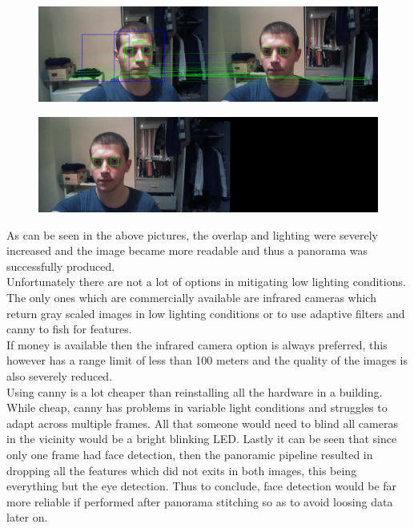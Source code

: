 \documentclass{article}
\begin{document}
\begin{figure}[H]
	\centering
	\includegraphics[width=15cm]{pkv.png}
	
	
\end{figure}
\begin{figure}[H]
	\centering
	\includegraphics[width=15cm]{pkr.png}
	
	
\end{figure}
As can be seen in the above pictures, the overlap and lighting were severely increased and the image became more readable and thus a panorama was successfully produced.\\
Unfortunately there are not a lot of options in mitigating low lighting conditions. The only ones which are commercially available are infrared cameras which return gray scaled images in low lighting conditions or to use adaptive filters and canny to fish for features.\\
If money is available then the infrared camera option is always preferred, this however has a range limit of less than 100 meters and the quality of the images is also severely reduced.\\
Using canny is a lot cheaper than reinstalling all the hardware in a building. While cheap, canny has problems in variable light conditions and struggles to adapt across multiple frames. All that someone would need to blind all cameras in the vicinity would be a bright blinking LED.
Lastly it can be seen that since only one frame had face detection, then the panoramic pipeline resulted in dropping all the features which did not exits in both images, this being everything but the eye detection. Thus to conclude, face detection would be far more reliable if performed after panorama stitching so as to avoid loosing data later on.
\end{document}
